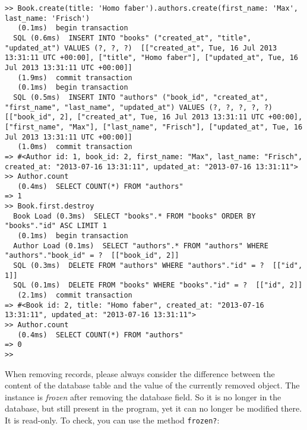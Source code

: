 \documentclass[a4paper]{book}
\newcounter{tab}[chapter]
\begin{document}
\begin{shaded}\begin{verbatim}
>> Book.create(title: 'Homo faber').authors.create(first_name: 'Max', last_name: 'Frisch')
   (0.1ms)  begin transaction
  SQL (0.6ms)  INSERT INTO "books" ("created_at", "title", "updated_at") VALUES (?, ?, ?)  [["created_at", Tue, 16 Jul 2013 13:31:11 UTC +00:00], ["title", "Homo faber"], ["updated_at", Tue, 16 Jul 2013 13:31:11 UTC +00:00]]
   (1.9ms)  commit transaction
   (0.1ms)  begin transaction
  SQL (0.5ms)  INSERT INTO "authors" ("book_id", "created_at", "first_name", "last_name", "updated_at") VALUES (?, ?, ?, ?, ?)  [["book_id", 2], ["created_at", Tue, 16 Jul 2013 13:31:11 UTC +00:00], ["first_name", "Max"], ["last_name", "Frisch"], ["updated_at", Tue, 16 Jul 2013 13:31:11 UTC +00:00]]
   (1.0ms)  commit transaction
=> #<Author id: 1, book_id: 2, first_name: "Max", last_name: "Frisch", created_at: "2013-07-16 13:31:11", updated_at: "2013-07-16 13:31:11">
>> Author.count
   (0.4ms)  SELECT COUNT(*) FROM "authors"
=> 1
>> Book.first.destroy
  Book Load (0.3ms)  SELECT "books".* FROM "books" ORDER BY "books"."id" ASC LIMIT 1
   (0.1ms)  begin transaction
  Author Load (0.1ms)  SELECT "authors".* FROM "authors" WHERE "authors"."book_id" = ?  [["book_id", 2]]
  SQL (0.3ms)  DELETE FROM "authors" WHERE "authors"."id" = ?  [["id", 1]]
  SQL (0.1ms)  DELETE FROM "books" WHERE "books"."id" = ?  [["id", 2]]
   (2.1ms)  commit transaction
=> #<Book id: 2, title: "Homo faber", created_at: "2013-07-16 13:31:11", updated_at: "2013-07-16 13:31:11">
>> Author.count
   (0.4ms)  SELECT COUNT(*) FROM "authors"
=> 0
>>
\end{verbatim}\end{shaded}

When removing records, please always consider the difference between the content of the database table and the value of the currently removed object. The instance is \emph{frozen} after removing the database field. So it is no longer in the database, but still present in the program, yet it can no longer be modified there. It is read-only. To check, you can use the method \texttt{frozen?}:
\end{document}
